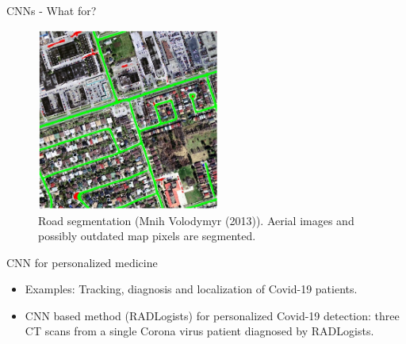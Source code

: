 \begin{vbframe}{CNNs - What for?}
  \begin{figure}
    \centering
    \includegraphics[width=6cm]{figure/road_seg.png}
    \caption{Road segmentation (Mnih Volodymyr (2013)). Aerial images and possibly outdated map pixels are segmented.}
  \end{figure}
\framebreak

\begin{figure}
  \centering
\end{figure}

{CNN for personalized medicine}
  \begin{itemize}
    \item Examples: Tracking, diagnosis and localization of Covid-19 patients.
    \item CNN based method (RADLogists) for personalized Covid-19 detection: three CT scans from a single Corona virus patient diagnosed by RADLogists. %
  \end{itemize}
  

\end{vbframe}
